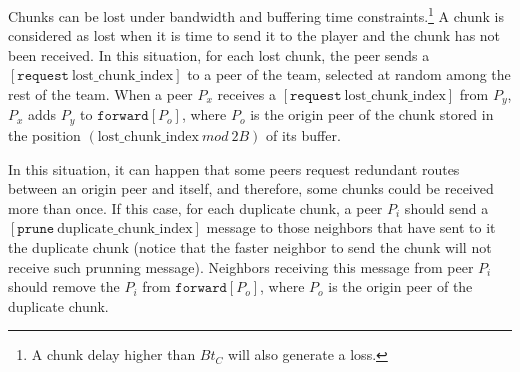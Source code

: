 
\label{sec:routes_discovery}

Chunks can be lost under bandwidth and buffering time
constraints.\footnote{A chunk delay higher than $Bt_C$ will also
  generate a loss.} A chunk is considered as lost when it is time to
send it to the player and the chunk has not been received.  In this
situation, for each lost chunk, the peer sends a
$[\mathtt{request}~\text{lost\_chunk\_index}]$ to a peer of the team,
selected at random among the rest of the team. When a peer $P_x$
receives a $[\mathtt{request}~\text{lost\_chunk\_index}]$ from $P_y$,
$P_x$ adds $P_y$ to $\mathtt{forward}[P_o]$, where $P_o$ is the origin
peer of the chunk stored in the position
$(\text{lost\_chunk\_index}~\mathit{mod}~2B)$ of its buffer.

\begin{comment}
origin peer of the next chunk stored in the
buffer. This peer has to characteristics: (1) it is not necessary a
neighbor peer, and (2) there is a high probability that this chunk has
been stored in the buffer ``for a long time'', so, if it is not a
neighbor, the link between it and the peer is working fairly well.
\end{comment}

  
In this situation, it can happen that some peers request redundant
routes between an origin peer and itself, and therefore, some chunks
could be received more than once. If this case, for each duplicate
chunk, a peer $P_i$ should send a
$[\mathtt{prune}~\text{duplicate\_chunk\_index}]$ message to those
neighbors that have sent to it the duplicate chunk (notice that the
faster neighbor to send the chunk will not receive such prunning
message). Neighbors receiving this message from peer $P_i$ should
remove the $P_i$ from $\mathtt{forward}[P_o]$, where $P_o$ is the
origin peer of the duplicate chunk.

